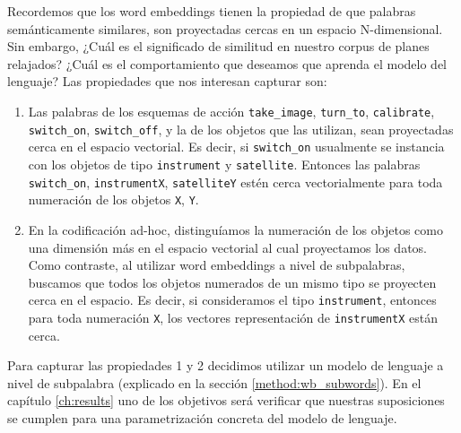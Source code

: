 Recordemos que los word embeddings tienen la propiedad de que palabras
semánticamente similares, son proyectadas cercas en un espacio N-dimensional.
Sin embargo, ¿Cuál es el significado de similitud en nuestro corpus de planes
relajados? ¿Cuál es el comportamiento que deseamos que aprenda el modelo del
lenguaje? Las propiedades que nos interesan capturar son:

\begin{enumerate}
    \item Las palabras de los esquemas de acción \verb|take_image|,
    \verb|turn_to|, \verb|calibrate|, \verb|switch_on|, \verb|switch_off|, y la
    de los objetos que las utilizan, sean proyectadas cerca en el espacio
    vectorial. Es decir, si \verb|switch_on| usualmente se instancia con los
    objetos de tipo \verb|instrument| y \verb|satellite|. Entonces las palabras
    \verb|switch_on|, \verb|instrumentX|, \verb|satelliteY| estén cerca
    vectorialmente para toda numeración de los objetos \verb|X|, \verb|Y|.
    \item En la codificación ad-hoc, distinguíamos la numeración de los objetos
    como una dimensión más en el espacio vectorial al cual proyectamos los
    datos. Como contraste, al utilizar word embeddings a nivel de
    subpalabras, buscamos que todos los objetos numerados de un mismo tipo se
    proyecten cerca en el espacio. Es decir, si consideramos el tipo
    \verb|instrument|, entonces para toda numeración \verb|X|, los vectores
    representación de \verb|instrumentX| están cerca.
\end{enumerate}

Para capturar las propiedades 1 y 2 decidimos utilizar un modelo de lenguaje a
nivel de subpalabra (explicado en la sección \ref{method:wb_subwords}). En el
capítulo \ref{ch:results} uno de los objetivos será verificar que nuestras
suposiciones se cumplen para una parametrización concreta del modelo de
lenguaje.

